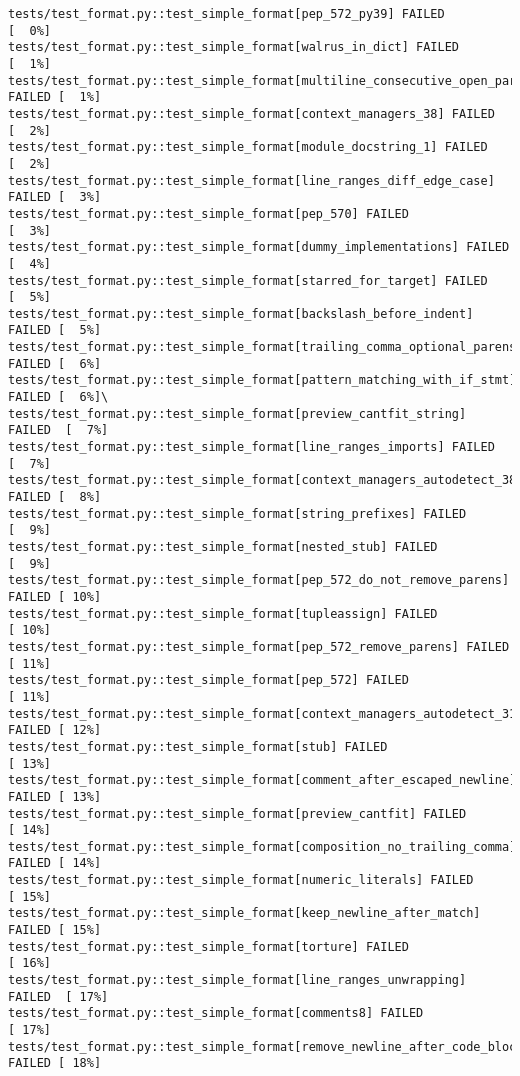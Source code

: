 \begin{Verbatim}[fontsize=\small, breaklines=true, breakanywhere=true]
tests/test_format.py::test_simple_format[pep_572_py39] FAILED            [  0%]
tests/test_format.py::test_simple_format[walrus_in_dict] FAILED          [  1%]
tests/test_format.py::test_simple_format[multiline_consecutive_open_parentheses_ignore] FAILED [  1%]
tests/test_format.py::test_simple_format[context_managers_38] FAILED     [  2%]
tests/test_format.py::test_simple_format[module_docstring_1] FAILED      [  2%]
tests/test_format.py::test_simple_format[line_ranges_diff_edge_case] FAILED [  3%]
tests/test_format.py::test_simple_format[pep_570] FAILED                 [  3%]
tests/test_format.py::test_simple_format[dummy_implementations] FAILED   [  4%]
tests/test_format.py::test_simple_format[starred_for_target] FAILED      [  5%]
tests/test_format.py::test_simple_format[backslash_before_indent] FAILED [  5%]
tests/test_format.py::test_simple_format[trailing_comma_optional_parens3] FAILED [  6%]
tests/test_format.py::test_simple_format[pattern_matching_with_if_stmt] FAILED [  6%]\
tests/test_format.py::test_simple_format[preview_cantfit_string] FAILED  [  7%]
tests/test_format.py::test_simple_format[line_ranges_imports] FAILED     [  7%]
tests/test_format.py::test_simple_format[context_managers_autodetect_38] FAILED [  8%]
tests/test_format.py::test_simple_format[string_prefixes] FAILED         [  9%]
tests/test_format.py::test_simple_format[nested_stub] FAILED             [  9%]
tests/test_format.py::test_simple_format[pep_572_do_not_remove_parens] FAILED [ 10%]
tests/test_format.py::test_simple_format[tupleassign] FAILED             [ 10%]
tests/test_format.py::test_simple_format[pep_572_remove_parens] FAILED   [ 11%]
tests/test_format.py::test_simple_format[pep_572] FAILED                 [ 11%]
tests/test_format.py::test_simple_format[context_managers_autodetect_310] FAILED [ 12%]
tests/test_format.py::test_simple_format[stub] FAILED                    [ 13%]
tests/test_format.py::test_simple_format[comment_after_escaped_newline] FAILED [ 13%]
tests/test_format.py::test_simple_format[preview_cantfit] FAILED         [ 14%]
tests/test_format.py::test_simple_format[composition_no_trailing_comma] FAILED [ 14%]
tests/test_format.py::test_simple_format[numeric_literals] FAILED        [ 15%]
tests/test_format.py::test_simple_format[keep_newline_after_match] FAILED [ 15%]
tests/test_format.py::test_simple_format[torture] FAILED                 [ 16%]
tests/test_format.py::test_simple_format[line_ranges_unwrapping] FAILED  [ 17%]
tests/test_format.py::test_simple_format[comments8] FAILED               [ 17%]
tests/test_format.py::test_simple_format[remove_newline_after_code_block_open] FAILED [ 18%]

\end{Verbatim}
